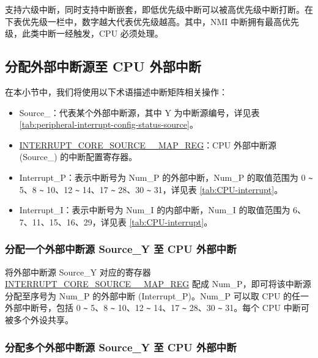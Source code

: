 \documentclass[main\_\_CN.tex]{subfiles}
\begin{document}
\chipname{} 支持六级中断，同时支持中断嵌套，即低优先级中断可以被高优先级中断打断。在下表优先级一栏中，数字越大代表优先级越高。其中，NMI 中断拥有最高优先级，此类中断一经触发，CPU 必须处理。




\subsection{分配外部中断源至 CPU 外部中断}

在本小节中，我们将使用以下术语描述中断矩阵相关操作：
\begin{itemize}

\item Source\_：代表某个外部中断源，其中 Y 为中断源编号，详见表 \ref{tab:peripheral-interrupt-config-status-source}。

\item \hyperref[regdesc:INTERRUPTCORE0CACHECORE1ACSINTMAPREG]{INTERRUPT\_CORE\_SOURCE\_\_MAP\_REG}：CPU 外部中断源 (Source\_) 的中断配置寄存器。

\item Interrupt\_P：表示中断号为 Num\_P 的外部中断，Num\_P 的取值范围为 0 \verb+~+ 5、8 \verb+~+ 10、12 \verb+~+ 14、17 \verb+~+ 28、30 \verb+~+ 31，详见表 \ref{tab:CPU-interrupt}。

\item Interrupt\_I：表示中断号为 Num\_I 的内部中断，Num\_I 的取值范围为 6、7、11、15、16、29，详见表 \ref{tab:CPU-interrupt}。
\end{itemize}

\subsubsection{分配一个外部中断源 Source\_Y 至 CPU 外部中断}

将外部中断源 Source\_Y 对应的寄存器 \hyperref[regdesc:INTERRUPTCORE0CACHECORE1ACSINTMAPREG]{INTERRUPT\_CORE\_SOURCE\_\_MAP\_REG} 配成 Num\_P，即可将该中断源分配至序号为 Num\_P 的外部中断 (Interrupt\_P)。Num\_P 可以取 CPU 的任一外部中断号，包括 0 \verb+~+ 5、8 \verb+~+ 10、12 \verb+~+ 14、17 \verb+~+ 28、30 \verb+~+ 31。每个 CPU 中断可被多个外设共享。

\subsubsection{分配多个外部中断源 Source\_Y 至 CPU 外部中断}
\end{document}
